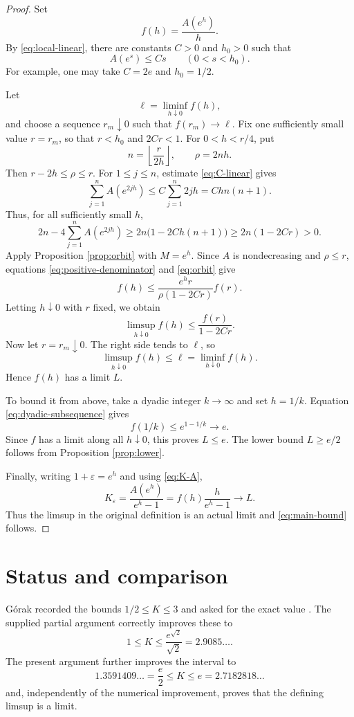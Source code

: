 \documentclass[11pt]{article}
\theoremstyle{remark}
\newcommand{\eps}{\varepsilon}
\begin{document}
\begin{proof}
Set
\[
 f(h)=\frac{A(e^h)}h.
\]
By \eqref{eq:local-linear}, there are constants $C>0$ and $h_0>0$ such
that
\begin{equation}\label{eq:C-linear}
 A(e^s)\le Cs\qquad(0<s<h_0).
\end{equation}
For example, one may take $C=2e$ and $h_0=1/2$.

Let
\[
 \ell=\liminf_{h\downarrow0}f(h),
\]
and choose a sequence $r_m\downarrow0$ such that $f(r_m)\to\ell$.
Fix one sufficiently small value $r=r_m$, so that
$r<h_0$ and $2Cr<1$.  For $0<h<r/4$, put
\[
 n=\left\lfloor\frac r{2h}\right\rfloor,
 \qquad \rho=2nh.
\]
Then $r-2h\le\rho\le r$.  For $1\le j\le n$, estimate
\eqref{eq:C-linear} gives
\[
 \sum_{j=1}^nA(e^{2jh})
 \le C\sum_{j=1}^n2jh
 =Chn(n+1).
\]
Thus, for all sufficiently small $h$,
\begin{equation}\label{eq:positive-denominator}
 2n-4\sum_{j=1}^nA(e^{2jh})
 \ge2n\bigl(1-2Ch(n+1)\bigr)
 \ge2n(1-2Cr)>0.
\end{equation}
Apply Proposition \ref{prop:orbit} with $M=e^h$.  Since $A$ is
nondecreasing and $\rho\le r$, equations
\eqref{eq:positive-denominator} and \eqref{eq:orbit} give
\[
 f(h)
 \le \frac{e^h r}{\rho(1-2Cr)}f(r).
\]
Letting $h\downarrow0$ with $r$ fixed, we obtain
\[
 \limsup_{h\downarrow0}f(h)\le\frac{f(r)}{1-2Cr}.
\]
Now let $r=r_m\downarrow0$.  The right side tends to $\ell$, so
\[
 \limsup_{h\downarrow0}f(h)\le\ell
 =\liminf_{h\downarrow0}f(h).
\]
Hence $f(h)$ has a limit $L$.

To bound it from above, take a dyadic integer $k\to\infty$ and set
$h=1/k$.  Equation \eqref{eq:dyadic-subsequence} gives
\[
 f(1/k)\le e^{1-1/k}\longrightarrow e.
\]
Since $f$ has a limit along all $h\downarrow0$, this proves $L\le e$.
The lower bound $L\ge e/2$ follows from Proposition \ref{prop:lower}.

Finally, writing $1+\eps=e^h$ and using \eqref{eq:K-A},
\[
 K_{\eps}
 =\frac{A(e^h)}{e^h-1}
 =f(h)\frac{h}{e^h-1}
 \longrightarrow L.
\]
Thus the limsup in the original definition is an actual limit and
\eqref{eq:main-bound} follows.
\end{proof}

\section{Status and comparison}

G\'orak recorded the bounds $1/2\le K\le3$ and asked for the exact value
\cite{Gorak}.  The supplied partial argument correctly improves these to
\[
 1\le K\le \frac{e^{\sqrt2}}{\sqrt2}=2.9085\ldots.
\]
The present argument further improves the interval to
\[
 1.3591409\ldots=\frac e2
 \le K\le
 e=2.7182818\ldots
\]
and, independently of the numerical improvement, proves that the defining
limsup is a limit.
\end{document}
